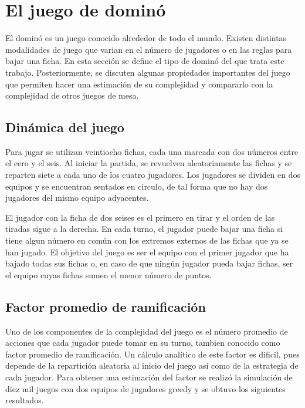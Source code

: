 \chapter{El juego de dominó}

\noindent

El dominó es un juego conocido alrededor de todo el mundo. Existen distintas
modalidades de juego que varian en el número de jugadores o en las reglas para
bajar una ficha. En esta sección se define el tipo de dominó del que trata este
trabajo. Posteriormente, se discuten algunas propiedades importantes del juego
que permiten hacer una estimación de su complejidad y compararlo con la
complejidad de otros juegos de mesa.

\newpage

\section{Dinámica del juego}

Para jugar se utilizan veintiocho fichas, cada una marcada con dos números entre
el cero y el seis. Al iniciar la partida, se revuelven aleatoriamente las fichas
y se reparten siete a cada uno de los cuatro jugadores. Los jugadores se dividen
en dos equipos y se encuentran sentados en circulo, de tal forma que no hay dos
jugadores del mismo equipo adyacentes.

El jugador con la ficha de dos seises es el primero en tirar y el orden de las
tiradas sigue a la derecha. En cada turno, el jugador puede bajar una ficha si
tiene algun número en común con los extremos externos de las fichas que ya se
han jugado. El objetivo del juego es ser el equipo con el primer jugador que ha
bajado todas sus fichas o, en caso de que ningún jugador pueda bajar fichas, ser
el equipo cuyas fichas sumen el menor número de puntos.

\section{Factor promedio de ramificación}

Uno de los componentes de la complejidad del juego es el número promedio de
acciones que cada jugador puede tomar en su turno, tambien conocido como factor
promedio de ramificación. Un cálculo analítico de este factor es dificil, pues
depende de la repartición aleatoria al inicio del juego así como de la
estrategia de cada jugador. Para obtener una estimación del factor se realizó la
simulación de diez mil juegos con dos equipos de jugadores greedy y se obtuvo
los siguientes resultados.

